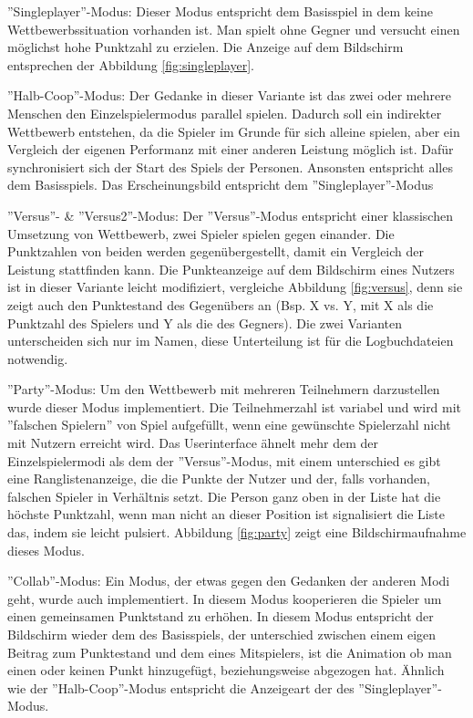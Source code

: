 \item''Singleplayer''-Modus:\newline
Dieser Modus entspricht dem Basisspiel in dem keine Wettbewerbssituation vorhanden ist. Man spielt ohne Gegner und versucht einen möglichst hohe Punktzahl zu erzielen. Die Anzeige auf dem Bildschirm entsprechen der Abbildung \ref{fig:singleplayer}.
\item''Halb-Coop''-Modus:\newline{}
Der Gedanke in dieser Variante ist das zwei oder mehrere Menschen den Einzelspielermodus parallel spielen. Dadurch soll ein indirekter Wettbewerb entstehen, da die Spieler im Grunde für sich alleine spielen, aber ein Vergleich der eigenen Performanz mit einer anderen Leistung möglich ist. Dafür synchronisiert sich der Start des Spiels der Personen. Ansonsten entspricht alles dem Basisspiels. Das Erscheinungsbild entspricht dem ''Singleplayer''-Modus
\item''Versus''- \& ''Versus2''-Modus:\newline
Der ''Versus''-Modus entspricht einer klassischen Umsetzung von Wettbewerb, zwei Spieler spielen gegen einander. Die Punktzahlen von beiden werden gegenübergestellt, damit ein Vergleich der Leistung stattfinden kann. Die Punkteanzeige auf dem Bildschirm eines Nutzers ist in dieser Variante leicht modifiziert,  vergleiche Abbildung \ref{fig:versus}, denn sie zeigt  auch den Punktestand des Gegenübers an (Bsp. X vs. Y, mit X als die Punktzahl des Spielers und Y als die des Gegners). Die zwei Varianten unterscheiden sich nur im Namen, diese Unterteilung ist für die Logbuchdateien notwendig.
\item''Party''-Modus:\newline
Um den Wettbewerb mit mehreren Teilnehmern darzustellen wurde dieser Modus implementiert. Die Teilnehmerzahl ist variabel und wird mit ''falschen Spielern'' von Spiel aufgefüllt, wenn eine gewünschte Spielerzahl nicht mit Nutzern erreicht wird. Das Userinterface ähnelt mehr dem der Einzelspielermodi als dem der ''Versus''-Modus, mit einem unterschied es gibt eine Ranglistenanzeige, die die Punkte der Nutzer und der, falls vorhanden, falschen Spieler in Verhältnis setzt. Die Person ganz oben in der Liste hat die höchste Punktzahl, wenn man nicht an dieser Position ist signalisiert die Liste das, indem sie leicht pulsiert. Abbildung \ref{fig:party} zeigt eine Bildschirmaufnahme dieses Modus.
\item''Collab''-Modus:\newline
Ein Modus, der etwas gegen den Gedanken der anderen Modi geht, wurde auch implementiert.  In diesem Modus kooperieren die Spieler um einen gemeinsamen Punktstand zu erhöhen. In diesem Modus entspricht der Bildschirm wieder dem des Basisspiels, der unterschied zwischen einem eigen Beitrag zum Punktestand und dem eines Mitspielers, ist die Animation ob man einen oder keinen Punkt hinzugefügt, beziehungsweise abgezogen hat. Ähnlich wie der ''Halb-Coop''-Modus entspricht die Anzeigeart der des ''Singleplayer''-Modus.

